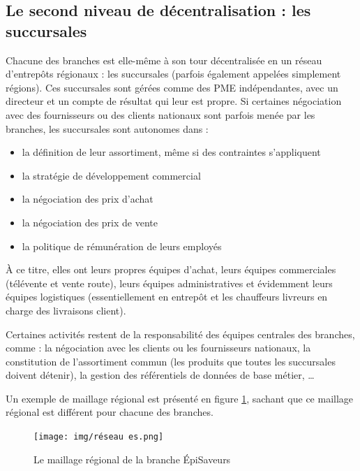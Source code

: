             \subsection{Le second niveau de décentralisation : les succursales}

            Chacune des branches est elle-même à son tour décentralisée en un réseau d'entrepôts régionaux : les succursales (parfois également appelées simplement \og régions\fg).
            Ces succursales sont gérées comme des PME indépendantes, avec un directeur et un compte de résultat qui leur est propre.
            Si certaines négociation avec des fournisseurs ou des clients nationaux sont parfois menée par les branches, les succursales sont autonomes dans :
            \begin{itemize}
                \item{la définition de leur assortiment, même si des contraintes s'appliquent}
                \item{la stratégie de développement commercial}
                \item{la négociation des prix d'achat}
                \item{la négociation des prix de vente}
                \item{la politique de rémunération de leurs employés}
            \end{itemize}
            
            \`{A} ce titre, elles ont leurs propres équipes d'achat, leurs équipes commerciales (télévente et vente route), leurs équipes administratives et évidemment leurs équipes logistiques (essentiellement en entrepôt et les chauffeurs livreurs en charge des livraisons client).

            Certaines activités restent de la responsabilité des équipes centrales des branches, comme : la négociation avec les clients ou les fournisseurs nationaux, la constitution de l'assortiment commun (les produits que toutes les succursales doivent détenir), la gestion des référentiels de données de base métier, \dots
            
            Un exemple de maillage régional est présenté en figure \ref{fig:reseau_es}, sachant que ce maillage régional est différent pour chacune des branches.
            \begin{figure}[htpb]
                \begin{center}
                \texttt{[image: img/réseau es.png]}
                \end{center}
                \caption{Le maillage régional de la branche \'{E}piSaveurs}
                \label{fig:reseau_es}
            \end{figure}



